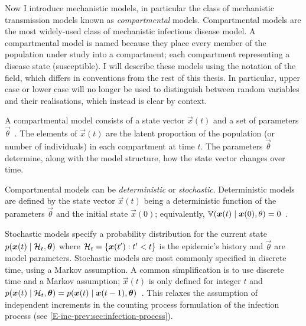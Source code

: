 \documentclass[thesis.tex]{subfiles}
\begin{document}
Now I introduce mechanistic models, in particular the class of mechanistic transmission models known as \emph{compartmental} models.
Compartmental models are the most widely-used class of mechanistic infectious disease model.
A compartmental model is named because they place every member of the population under study into a compartment; each compartment representing a disease state (\eg susceptible).
I will describe these models using the notation of the field, which differs in conventions from the rest of this thesis.
In particular, upper case or lower case will no longer be used to distinguish between random variables and their realisations, which instead is clear by context.

A compartmental model consists of a state vector $\vec{x}(t)$ and a set of parameters $\vec{\theta}$~\autocite{birrellEvidence}.
The elements of $\vec{x}(t)$ are the latent proportion of the population (or number of individuals) in each compartment at time $t$.
The parameters $\vec{\theta}$ determine, along with the model structure, how the state vector changes over time.

Compartmental models can be \emph{deterministic} or \emph{stochastic}.
Deterministic models are defined by the state vector $\vec{x}(t)$ being a deterministic function of the parameters $\vec{\theta}$ and the initial state $\vec{x}(0)$; equivalently, $\operatorname{\mathbb{V}}(\bm{x}(t) \mid \bm{x}(0), \theta) = 0$~\autocite{birrellEvidence}.

Stochastic models specify a probability distribution for the current state $p(\bm{x}(t) \mid \mathcal{H}_t, \bm{\theta})$ where $\mathcal{H}_t = \{ \bm{x}(t') : t' < t \}$ is the epidemic's history and $\vec{\theta}$ are model parameters.
Stochastic models are most commonly specified in discrete time, using a Markov assumption.
A common simplification is to use discrete time and a Markov assumption; \ie $\vec{x}(t)$ is only defined for integer $t$ and $p(\bm{x}(t) \mid \mathcal{H}_t, \bm{\theta}) = p(\bm{x}(t) \mid \bm{x}(t-1), \bm{\theta})$~\autocite{birrellEvidence}.
This relaxes the assumption of independent increments in the counting process formulation of the infection process (see \cref{E-inc-prev:sec:infection-process}).
\end{document}
